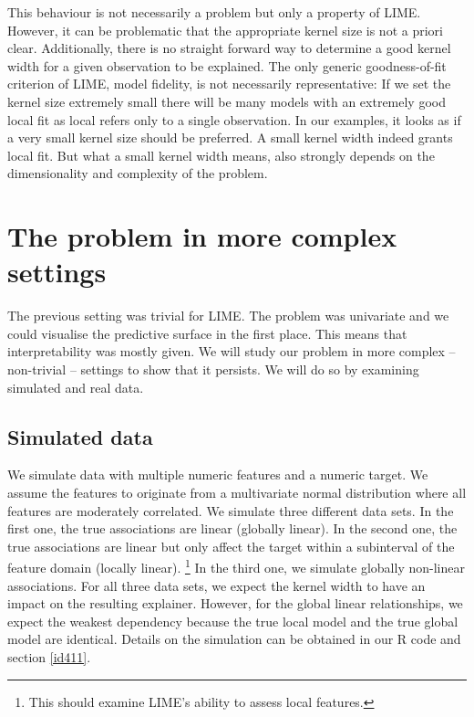 \documentclass[]{krantz}
\begin{document}
This behaviour is not necessarily a problem but only a property of LIME.
However, it can be problematic that the appropriate kernel size is not a
priori clear. Additionally, there is no straight forward way to
determine a good kernel width for a given observation to be explained.
The only generic goodness-of-fit criterion of LIME, model fidelity, is
not necessarily representative: If we set the kernel size extremely
small there will be many models with an extremely good local fit as
local refers only to a single observation. In our examples, it looks as
if a very small kernel size should be preferred. A small kernel width
indeed grants local fit. But what a small kernel width means, also
strongly depends on the dimensionality and complexity of the problem.

\section{The problem in more complex settings}\label{id4}

The previous setting was trivial for LIME. The problem was univariate
and we could visualise the predictive surface in the first place. This
means that interpretability was mostly given. We will study our problem
in more complex -- non-trivial -- settings to show that it persists. We
will do so by examining simulated and real data.

\subsection{Simulated data}\label{id41}

We simulate data with multiple numeric features and a numeric target. We
assume the features to originate from a multivariate normal distribution
where all features are moderately correlated. We simulate three
different data sets. In the first one, the true associations are linear
(globally linear). In the second one, the true associations are linear
but only affect the target within a subinterval of the feature domain
(locally linear). \footnote{This should examine LIME's ability to assess
  local features.} In the third one, we simulate globally non-linear
associations. For all three data sets, we expect the kernel width to
have an impact on the resulting explainer. However, for the global
linear relationships, we expect the weakest dependency because the true
local model and the true global model are identical. Details on the
simulation can be obtained in our R code and section \ref{id411}.
\end{document}
